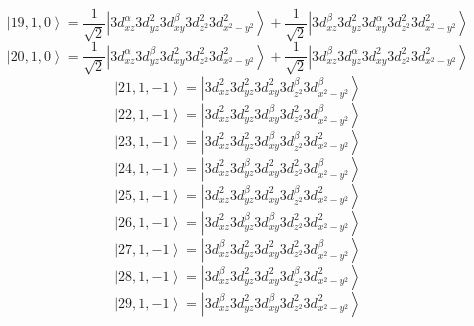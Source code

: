 \documentclass[11pt]{article}
\begin{document}
\begin{equation*}
\left|19,1,0\right>=\frac{1}{\sqrt{2}}\left|3d_{xz}^{\alpha}3d_{yz}^{2}3d_{xy}^{\beta}3d_{z^2}^{2}3d_{x^2-y^2}^{2}\right>+\frac{1}{\sqrt{2}}\left|3d_{xz}^{\beta}3d_{yz}^{2}3d_{xy}^{\alpha}3d_{z^2}^{2}3d_{x^2-y^2}^{2}\right>\end{equation*}
\begin{equation*}
\left|20,1,0\right>=\frac{1}{\sqrt{2}}\left|3d_{xz}^{\alpha}3d_{yz}^{\beta}3d_{xy}^{2}3d_{z^2}^{2}3d_{x^2-y^2}^{2}\right>+\frac{1}{\sqrt{2}}\left|3d_{xz}^{\beta}3d_{yz}^{\alpha}3d_{xy}^{2}3d_{z^2}^{2}3d_{x^2-y^2}^{2}\right>\end{equation*}
\begin{equation*}
\left|21,1,-1\right>=\left|3d_{xz}^{2}3d_{yz}^{2}3d_{xy}^{2}3d_{z^2}^{\beta}3d_{x^2-y^2}^{\beta}\right>\end{equation*}
\begin{equation*}
\left|22,1,-1\right>=\left|3d_{xz}^{2}3d_{yz}^{2}3d_{xy}^{\beta}3d_{z^2}^{2}3d_{x^2-y^2}^{\beta}\right>\end{equation*}
\begin{equation*}
\left|23,1,-1\right>=\left|3d_{xz}^{2}3d_{yz}^{2}3d_{xy}^{\beta}3d_{z^2}^{\beta}3d_{x^2-y^2}^{2}\right>\end{equation*}
\begin{equation*}
\left|24,1,-1\right>=\left|3d_{xz}^{2}3d_{yz}^{\beta}3d_{xy}^{2}3d_{z^2}^{2}3d_{x^2-y^2}^{\beta}\right>\end{equation*}
\begin{equation*}
\left|25,1,-1\right>=\left|3d_{xz}^{2}3d_{yz}^{\beta}3d_{xy}^{2}3d_{z^2}^{\beta}3d_{x^2-y^2}^{2}\right>\end{equation*}
\begin{equation*}
\left|26,1,-1\right>=\left|3d_{xz}^{2}3d_{yz}^{\beta}3d_{xy}^{\beta}3d_{z^2}^{2}3d_{x^2-y^2}^{2}\right>\end{equation*}
\begin{equation*}
\left|27,1,-1\right>=\left|3d_{xz}^{\beta}3d_{yz}^{2}3d_{xy}^{2}3d_{z^2}^{2}3d_{x^2-y^2}^{\beta}\right>\end{equation*}
\begin{equation*}
\left|28,1,-1\right>=\left|3d_{xz}^{\beta}3d_{yz}^{2}3d_{xy}^{2}3d_{z^2}^{\beta}3d_{x^2-y^2}^{2}\right>\end{equation*}
\begin{equation*}
\left|29,1,-1\right>=\left|3d_{xz}^{\beta}3d_{yz}^{2}3d_{xy}^{\beta}3d_{z^2}^{2}3d_{x^2-y^2}^{2}\right>\end{equation*}
\end{document}
